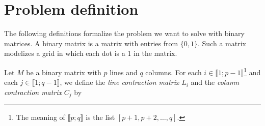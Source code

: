 \section{Problem definition}
\label{sec:problemdef}

The following definitions formalize the problem we want to solve with binary matrices. A binary matrix is a matrix with entries from $\{0,1\}$. Such a matrix modelizes a grid in which each dot is a 1 in the matrix.

\begin{definition}
Let $M$ be a binary matrix with $p$ lines and $q$ columns. For each $i \in \llbracket 1; p-1 \rrbracket$\footnote[1]{The meaning of $\llbracket p; q \rrbracket$ is the list $[p+1,p+2,\dots, q]$.} and each $j \in \llbracket 1; q-1 \rrbracket$, we define the \emph{line contraction matrix} $L_i$ and the \emph{column contraction matrix} $C_j$ by 
\begin{center}
\end{center}
\end{definition}
